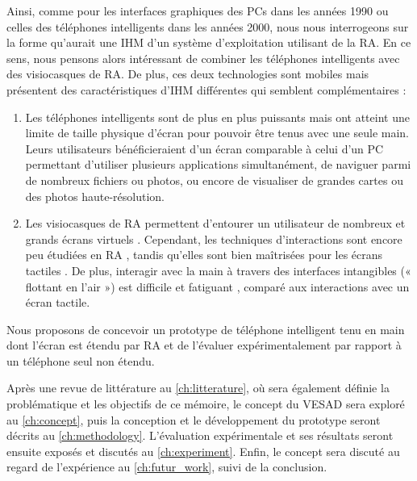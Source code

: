 
Ainsi, comme pour les interfaces graphiques des PCs dans les années 1990 ou celles des téléphones intelligents dans les années 2000, nous nous interrogeons sur la forme qu'aurait une IHM d'un système d'exploitation utilisant de la RA. En ce sens, nous pensons alors intéressant de combiner les téléphones intelligents avec des visiocasques de RA. De plus, ces deux technologies sont mobiles mais présentent des caractéristiques d'IHM différentes qui semblent complémentaires :
\begin{enumerate}
  \item Les téléphones intelligents sont de plus en plus puissants mais ont atteint une limite de taille physique d'écran pour pouvoir être tenus avec une seule main. Leurs utilisateurs bénéficieraient d'un écran comparable à celui d'un PC permettant d'utiliser plusieurs applications simultanément, de naviguer parmi de nombreux fichiers ou photos, ou encore de visualiser de grandes cartes ou des photos haute-résolution.
  \item Les visiocasques de RA permettent d'entourer un utilisateur de nombreux et grands écrans virtuels \citep{Ens2014}. Cependant, 
  les techniques d'interactions sont encore peu étudiées en RA \citep{Piumsomboon2013}, tandis qu'elles sont bien maîtrisées pour les écrans tactiles \citep{Wobbrock2009}. De plus, interagir avec la main à travers des interfaces intangibles (« flottant en l'air ») est difficile \citep{Chan2010} et fatiguant \citep{Hincapie-Ramos2014}, comparé aux interactions avec un écran tactile.
\end{enumerate}

Nous proposons de concevoir un prototype de téléphone intelligent tenu en main dont l'écran est étendu par RA et de l'évaluer expérimentalement par rapport à un téléphone seul non étendu.

Après une revue de littérature au \autoref{ch:litterature}, où sera également définie la problématique et les objectifs de ce mémoire, le concept du VESAD sera exploré au \autoref{ch:concept}, puis la conception et le développement du prototype seront décrits au \autoref{ch:methodology}. L'évaluation expérimentale et ses résultats seront ensuite exposés et discutés au \autoref{ch:experiment}. Enfin, le concept sera discuté au regard de l'expérience au \autoref{ch:futur_work}, suivi de la conclusion.